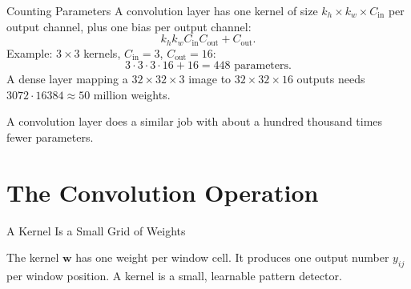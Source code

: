 \documentclass{ntuabeamer}
\begin{document}
\begin{frame}{Counting Parameters}
  A convolution layer has one kernel of size $k_h\times k_w\times C_{\mathrm{in}}$ per output channel, plus one bias per output channel:
  \[
    k_hk_wC_{\mathrm{in}}C_{\mathrm{out}}+C_{\mathrm{out}} .
  \]
  Example: $3\times3$ kernels, $C_{\mathrm{in}}=3$, $C_{\mathrm{out}}=16$:
  \[
    3\cdot3\cdot3\cdot16+16=448 \text{ parameters.}
  \]
  A dense layer mapping a $32\times32\times3$ image to $32\times32\times16$ outputs needs
  $3072\cdot16384\approx50$ million weights.

  A convolution layer does a similar job with about a hundred thousand times fewer parameters.
\end{frame}



\section{The Convolution Operation}

\begin{frame}{A Kernel Is a Small Grid of Weights}
  \centering

  The kernel $\mathbf w$ has one weight per window cell. It produces one output number $y_{ij}$ per window position.
  A kernel is a small, learnable pattern detector.
\end{frame}
\end{document}
